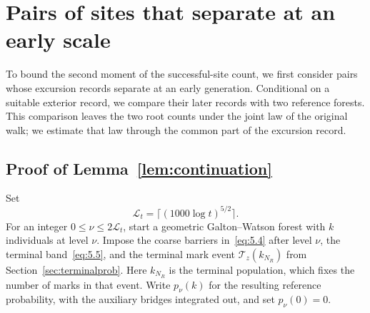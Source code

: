 \documentclass[11pt,a4paper]{article}
\numberwithin{equation}{section}
\theoremstyle{remark}
\begin{document}
\section{Pairs of sites that separate at an early scale}\label{sec:tworoot}
To bound the second moment of the successful-site count, we first consider pairs whose excursion records separate at an early generation. Conditional on a suitable exterior record, we compare their later records with two reference forests. This comparison leaves the two root counts under the joint law of the original walk; we estimate that law through the common part of the excursion record.

\subsection{Proof of Lemma~\ref{lem:continuation}}\label{sec:continuation}
Set
\begin{equation}\label{eq:7.29}
\mathcal L_t=\lceil(1000\log t)^{5/2}\rceil.
\end{equation}
For an integer $0\le\nu\le2\mathcal L_t$, start a geometric Galton--Watson forest with $k$ individuals at level $\nu$. Impose the coarse barriers in~\eqref{eq:5.4} after level $\nu$, the terminal band~\eqref{eq:5.5}, and the terminal mark event $\mathcal T_z(k_{N_R})$ from Section~\ref{sec:terminalprob}. Here $k_{N_R}$ is the terminal population, which fixes the number of marks in that event. Write $p_\nu(k)$ for the resulting reference probability, with the auxiliary bridges integrated out, and set $p_\nu(0)=0$.
\end{document}
